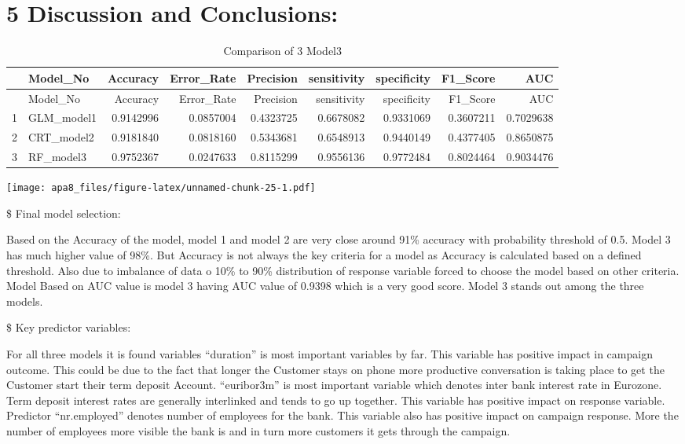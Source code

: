 \documentclass[english,floatsintext,man]{apa6}
\begin{document}
\section{5 Discussion and
Conclusions:}\label{discussion-and-conclusions}

\begin{longtable}[c]{@{}llrrrrrrr@{}}
\caption{Comparison of 3 Model3}\tabularnewline
\toprule
& Model\_No & Accuracy & Error\_Rate & Precision & sensitivity &
specificity & F1\_Score & AUC\tabularnewline
\midrule
\endfirsthead
\toprule
& Model\_No & Accuracy & Error\_Rate & Precision & sensitivity &
specificity & F1\_Score & AUC\tabularnewline
\midrule
\endhead
1 & GLM\_model1 & 0.9142996 & 0.0857004 & 0.4323725 & 0.6678082 &
0.9331069 & 0.3607211 & 0.7029638\tabularnewline
2 & CRT\_model2 & 0.9181840 & 0.0818160 & 0.5343681 & 0.6548913 &
0.9440149 & 0.4377405 & 0.8650875\tabularnewline
3 & RF\_model3 & 0.9752367 & 0.0247633 & 0.8115299 & 0.9556136 &
0.9772484 & 0.8024464 & 0.9034476\tabularnewline
\bottomrule
\end{longtable}

\texttt{[image: apa8\_files/figure-latex/unnamed-chunk-25-1.pdf]}

\$ Final model selection:

Based on the Accuracy of the model, model 1 and model 2 are very close
around 91\% accuracy with probability threshold of 0.5. Model 3 has much
higher value of 98\%. But Accuracy is not always the key criteria for a
model as Accuracy is calculated based on a defined threshold. Also due
to imbalance of data o 10\% to 90\% distribution of response variable
forced to choose the model based on other criteria. Model Based on AUC
value is model 3 having AUC value of 0.9398 which is a very good score.
Model 3 stands out among the three models.

\$ Key predictor variables:

For all three models it is found variables \enquote{duration} is most
important variables by far. This variable has positive impact in
campaign outcome. This could be due to the fact that longer the Customer
stays on phone more productive conversation is taking place to get the
Customer start their term deposit Account. \enquote{euribor3m} is most
important variable which denotes inter bank interest rate in Eurozone.
Term deposit interest rates are generally interlinked and tends to go up
together. This variable has positive impact on response variable.
Predictor \enquote{nr.employed} denotes number of employees for the
bank. This variable also has positive impact on campaign response. More
the number of employees more visible the bank is and in turn more
customers it gets through the campaign.
\end{document}
